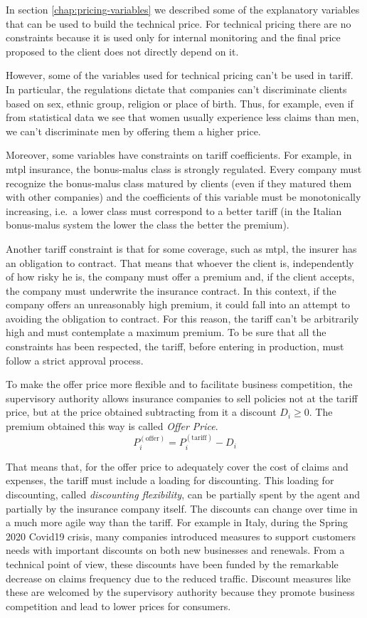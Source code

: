\documentclass[a4paper, twoside, openright, 12pt]{report}
\theoremstyle{definition}
\theoremstyle{definition}
\theoremstyle{definition}
\theoremstyle{remark}
\begin{document}
In section \ref{chap:pricing-variables} we described some of the explanatory variables that can be used to build the technical price. For technical pricing there are no constraints because it is used only for internal monitoring and the final price proposed to the client does not directly depend on it.

However, some of the variables used for technical pricing can't be used in tariff. In particular, the regulations dictate that companies can't discriminate clients based on sex, ethnic group, religion or place of birth. Thus, for example, even if from statistical data we see that women usually experience less claims than men, we can't discriminate men by offering them a higher price.

Moreover, some variables have constraints on tariff coefficients. For example, in \ac{mtpl} insurance, the bonus-malus class is strongly regulated. Every company must recognize the bonus-malus class matured by clients (even if they matured them with other companies) and the coefficients of this variable must be monotonically increasing, i.e.~a lower class must correspond to a better tariff (in the Italian bonus-malus system the lower the class the better the premium).

Another tariff constraint is that for some coverage, such as \ac{mtpl}, the insurer has an obligation to contract. That means that whoever the client is, independently of how risky he is, the company must offer a premium and, if the client accepts, the company must underwrite the insurance contract. In this context, if the company offers an unreasonably high premium, it could fall into an attempt to avoiding the obligation to contract. For this reason, the tariff can't be arbitrarily high and must contemplate a maximum premium. To be sure that all the constraints has been respected, the tariff, before entering in production, must follow a strict approval process.

To make the offer price more flexible and to facilitate business competition, the supervisory authority allows insurance companies to sell policies not at the tariff price, but at the price obtained subtracting from it a discount \(D_i\ge0\). The premium obtained this way is called \emph{Offer Price}.
\[
P^{(\text{offer})}_i = P^{(\text{tariff})}_i - D_i
\]

That means that, for the offer price to adequately cover the cost of claims and expenses, the tariff must include a loading for discounting. This loading for discounting, called \emph{discounting flexibility}, can be partially spent by the agent and partially by the insurance company itself. The discounts can change over time in a much more agile way than the tariff. For example in Italy, during the Spring 2020 Covid19 crisis, many companies introduced measures to support customers needs with important discounts on both new businesses and renewals. From a technical point of view, these discounts have been funded by the remarkable decrease on claims frequency due to the reduced traffic. Discount measures like these are welcomed by the supervisory authority because they promote business competition and lead to lower prices for consumers.
\end{document}
